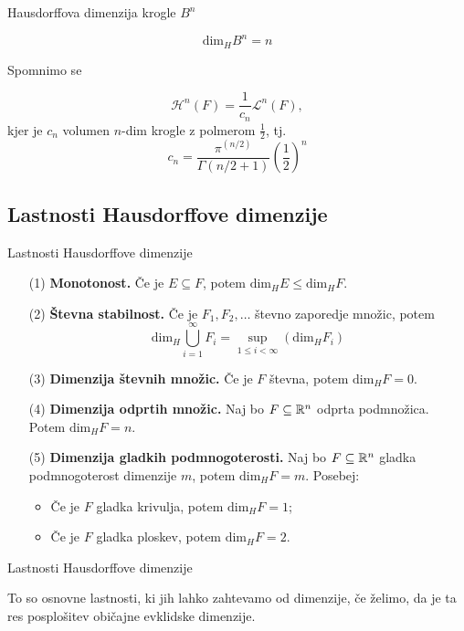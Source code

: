 \documentclass[10pt]{beamer}
\begin{document}
\begin{frame}[t]{Hausdorffova dimenzija krogle \(B^n\)}
    \begin{lema}
        \[\text{dim}_H B^n = n\]
    \end{lema}
    
    \pause
    Spomnimo se
    \begin{lema}
        \[\mathcal{H}^n(F) = \frac{1}{c_n} \mathcal{L}^n(F),\]
        kjer je \(c_n\) volumen \(n\)-dim krogle z polmerom \(\frac{1}{2}\), tj. 
        \[c_n = \frac{\pi^{(n/2)}}{\Gamma(n/2 + 1)} \left(\frac{1}{2}\right)^n\]
    \end{lema}
\end{frame}

\subsection{Lastnosti Hausdorffove dimenzije}
\begin{frame}[t]{Lastnosti Hausdorffove dimenzije}
    \begin{itemize}
        \item[(1)] \textbf{Monotonost.} Če je \(E \subseteq F\), potem \(\text{dim}_H E \leq \text{dim}_H F\).
        \pause
        \item[(2)] \textbf{Števna stabilnost.} Če je \(F_1, F_2, \ldots\) števno zaporedje množic, potem 
        \[\text{dim}_H \bigcup_{i=1}^\infty F_i = \sup_{1 \leq i < \infty} (\text{dim}_H F_i)\]
        \pause
        \item[(3)] \textbf{Dimenzija števnih množic.} Če je \(F\) števna, potem \(\text{dim}_H F = 0\).
        \pause
        \item[(4)] \textbf{Dimenzija odprtih množic.} Naj bo \(F \subseteq \mathbb{R}^n\) odprta podmnožica. Potem \(\text{dim}_H F = n\).
        \pause
        \item[(5)] \textbf{Dimenzija gladkih podmnogoterosti.} Naj bo \(F \subseteq \mathbb{R}^n\) gladka podmnogoterost dimenzije \(m\), potem \(\text{dim}_H F = m\). Posebej:
        \begin{itemize}
            \item Če je \(F\) gladka krivulja, potem \(\text{dim}_H F = 1\);
            \item Če je \(F\) gladka ploskev, potem \(\text{dim}_H F = 2\).
        \end{itemize}
    \end{itemize}
\end{frame}

\begin{frame}[t]{Lastnosti Hausdorffove dimenzije}
    \begin{opomba}
        To so osnovne lastnosti, ki jih lahko zahtevamo od dimenzije, če želimo, da je ta res posplošitev običajne evklidske dimenzije.
    \end{opomba}
\end{frame}
\end{document}
